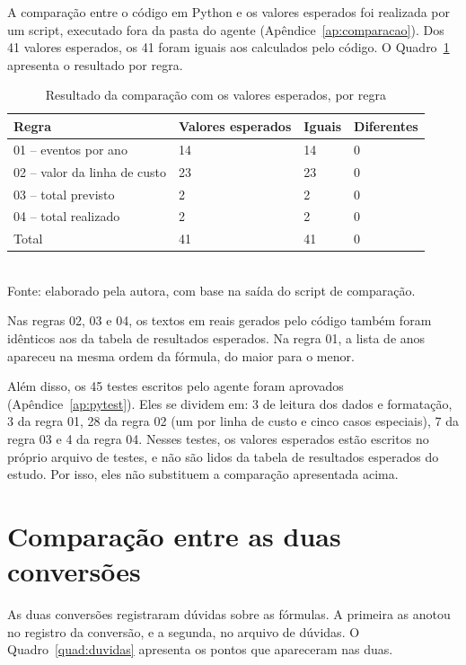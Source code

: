 A comparação entre o código em Python e os valores esperados foi realizada por um script, executado fora da pasta do agente (Apêndice~\ref{ap:comparacao}). Dos 41 valores esperados, os 41 foram iguais aos calculados pelo código. O Quadro~\ref{quad:comparacao} apresenta o resultado por regra.

\begin{table}[htb]
\centering
\caption{Resultado da comparação com os valores esperados, por regra}
\label{quad:comparacao}
\small
\begin{tabular}{p{5.6cm}p{2.2cm}p{1.6cm}p{1.8cm}}
\toprule
\textbf{Regra} & \textbf{Valores esperados} & \textbf{Iguais} & \textbf{Diferentes} \\
\midrule
01 -- eventos por ano & 14 & 14 & 0 \\
02 -- valor da linha de custo & 23 & 23 & 0 \\
03 -- total previsto & 2 & 2 & 0 \\
04 -- total realizado & 2 & 2 & 0 \\
\midrule
Total & 41 & 41 & 0 \\
\bottomrule
\end{tabular}
\\[2pt]
\footnotesize Fonte: elaborado pela autora, com base na saída do script de comparação.
\end{table}

Nas regras 02, 03 e 04, os textos em reais gerados pelo código também foram idênticos aos da tabela de resultados esperados. Na regra 01, a lista de anos apareceu na mesma ordem da fórmula, do maior para o menor.

Além disso, os 45 testes escritos pelo agente foram aprovados (Apêndice~\ref{ap:pytest}). Eles se dividem em: 3 de leitura dos dados e formatação, 3 da regra 01, 28 da regra 02 (um por linha de custo e cinco casos especiais), 7 da regra 03 e 4 da regra 04. Nesses testes, os valores esperados estão escritos no próprio arquivo de testes, e não são lidos da tabela de resultados esperados do estudo. Por isso, eles não substituem a comparação apresentada acima.

\section{Comparação entre as duas conversões}
\label{sec:comparacao-conversoes}

As duas conversões registraram dúvidas sobre as fórmulas. A primeira as anotou no registro da conversão, e a segunda, no arquivo de dúvidas. O Quadro~\ref{quad:duvidas} apresenta os pontos que apareceram nas duas.

